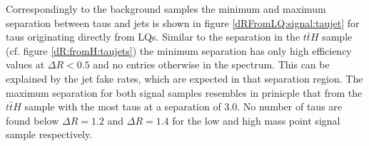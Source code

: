 %
Correspondingly to the background samples the minimum and maximum separation between taus and jets is shown in figure \ref{dRFromLQ:signal:taujet} for taus originating directly from LQs. Similar to the separation in the $t\bar{t}H$ sample (cf. figure \ref{dR:fromH:taujets}) the minimum separation has only high efficiency values at $\Delta R<0.5$ and no entries otherwise in the spectrum. This can be explained by the jet fake rates, which are expected in that separation region. The maximum separation for both signal samples resembles in prinicple that from the $t\bar{t}H$ sample with the most taus at a separation of $3.0$. No number of taus are found below $\Delta R=1.2$ and $\Delta R=1.4$ for the low and high mass point signal sample respectively. \newline
%
%
%
